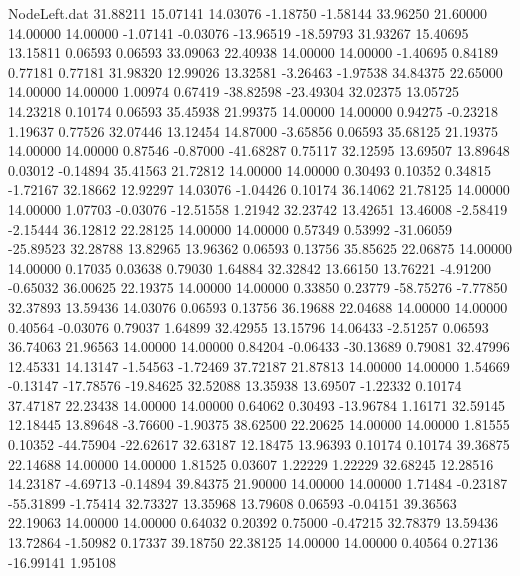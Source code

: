 \begin{filecontents}{NodeLeft.dat}
  31.88211   15.07141   14.03076    -1.18750   -1.58144   33.96250   21.60000   14.00000   14.00000   -1.07141   -0.03076  -13.96519  -18.59793
  31.93267   15.40695   13.15811     0.06593    0.06593   33.09063   22.40938   14.00000   14.00000   -1.40695    0.84189    0.77181    0.77181
  31.98320   12.99026   13.32581    -3.26463   -1.97538   34.84375   22.65000   14.00000   14.00000    1.00974    0.67419  -38.82598  -23.49304
  32.02375   13.05725   14.23218     0.10174    0.06593   35.45938   21.99375   14.00000   14.00000    0.94275   -0.23218    1.19637    0.77526
  32.07446   13.12454   14.87000    -3.65856    0.06593   35.68125   21.19375   14.00000   14.00000    0.87546   -0.87000  -41.68287    0.75117
  32.12595   13.69507   13.89648     0.03012   -0.14894   35.41563   21.72812   14.00000   14.00000    0.30493    0.10352    0.34815   -1.72167
  32.18662   12.92297   14.03076    -1.04426    0.10174   36.14062   21.78125   14.00000   14.00000    1.07703   -0.03076  -12.51558    1.21942
  32.23742   13.42651   13.46008    -2.58419   -2.15444   36.12812   22.28125   14.00000   14.00000    0.57349    0.53992  -31.06059  -25.89523
  32.28788   13.82965   13.96362     0.06593    0.13756   35.85625   22.06875   14.00000   14.00000    0.17035    0.03638    0.79030    1.64884
  32.32842   13.66150   13.76221    -4.91200   -0.65032   36.00625   22.19375   14.00000   14.00000    0.33850    0.23779  -58.75276   -7.77850
  32.37893   13.59436   14.03076     0.06593    0.13756   36.19688   22.04688   14.00000   14.00000    0.40564   -0.03076    0.79037    1.64899
  32.42955   13.15796   14.06433    -2.51257    0.06593   36.74063   21.96563   14.00000   14.00000    0.84204   -0.06433  -30.13689    0.79081
  32.47996   12.45331   14.13147    -1.54563   -1.72469   37.72187   21.87813   14.00000   14.00000    1.54669   -0.13147  -17.78576  -19.84625
  32.52088   13.35938   13.69507    -1.22332    0.10174   37.47187   22.23438   14.00000   14.00000    0.64062    0.30493  -13.96784    1.16171
  32.59145   12.18445   13.89648    -3.76600   -1.90375   38.62500   22.20625   14.00000   14.00000    1.81555    0.10352  -44.75904  -22.62617
  32.63187   12.18475   13.96393     0.10174    0.10174   39.36875   22.14688   14.00000   14.00000    1.81525    0.03607    1.22229    1.22229
  32.68245   12.28516   14.23187    -4.69713   -0.14894   39.84375   21.90000   14.00000   14.00000    1.71484   -0.23187  -55.31899   -1.75414
  32.73327   13.35968   13.79608     0.06593   -0.04151   39.36563   22.19063   14.00000   14.00000    0.64032    0.20392    0.75000   -0.47215
  32.78379   13.59436   13.72864    -1.50982    0.17337   39.18750   22.38125   14.00000   14.00000    0.40564    0.27136  -16.99141    1.95108

\end{filecontents}
